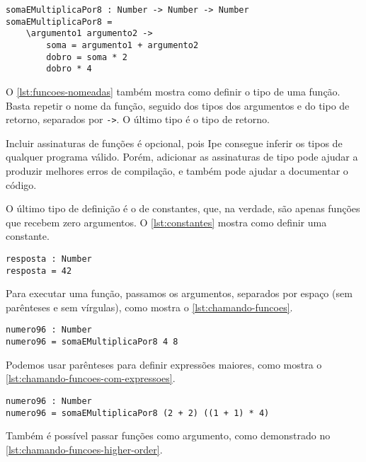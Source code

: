 \begin{lstlisting}[label={lst:funcoes-nomeadas},caption={Exemplo de como definir uma função nomeada}]
somaEMultiplicaPor8 : Number -> Number -> Number
somaEMultiplicaPor8 =
    \argumento1 argumento2 ->
        soma = argumento1 + argumento2
        dobro = soma * 2
        dobro * 4
\end{lstlisting}

O \autoref{lst:funcoes-nomeadas} também mostra como definir o tipo de uma função.
Basta repetir o nome da função, seguido dos tipos dos argumentos e do tipo de retorno,
separados por \texttt{->}. O último tipo é o tipo de retorno.

Incluir assinaturas de funções é opcional, pois Ipe consegue inferir os tipos de
qualquer programa válido. Porém, adicionar as assinaturas de tipo pode ajudar a
produzir melhores erros de compilação, e também pode ajudar a documentar o código.

O último tipo de definição é o de constantes, que, na verdade, são apenas funções
que recebem zero argumentos. O \autoref{lst:constantes} mostra como definir uma
constante.

\begin{lstlisting}[label={lst:constantes},caption={Exemplo de como definir uma constante}]
resposta : Number
resposta = 42
\end{lstlisting}

Para executar uma função, passamos os argumentos, separados por espaço (sem parênteses
e sem vírgulas), como mostra o \autoref{lst:chamando-funcoes}.

\begin{lstlisting}[label={lst:chamando-funcoes},caption={Exemplo de como chamar uma função}]
numero96 : Number
numero96 = somaEMultiplicaPor8 4 8
\end{lstlisting}

Podemos usar parênteses para definir expressões maiores, como mostra o
\autoref{lst:chamando-funcoes-com-expressoes}.

\begin{lstlisting}[label={lst:chamando-funcoes-com-expressoes},caption={Exemplo de como chamar uma função com uma expressões maiores}]
numero96 : Number
numero96 = somaEMultiplicaPor8 (2 + 2) ((1 + 1) * 4)
\end{lstlisting}

Também é possível passar funções como argumento, como demonstrado no \autoref{lst:chamando-funcoes-higher-order}.

